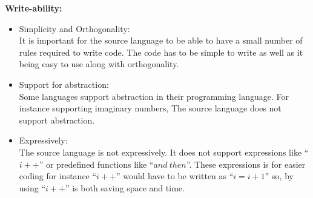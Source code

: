 \textbf{Write-ability:} \\
\begin{itemize}
\item Simplicity and Orthogonality: \\
It is important for the source language to be able to have a small number of rules required to write code. The code has to be simple to write as well as it being easy to use along with orthogonality.
\item Support for abstraction: \\
Some languages support abstraction  in their programming language. For instance supporting imaginary numbers, The source language does not support abstraction. 
\item Expressively: \\
The source language is not expressively. It does not support expressions like ``$i++$'' or predefined functions like ``$and~then$''. These expressions is for easier coding for instance ``$i++$'' would have to be written as ``$i = i + 1$'' so, by using ``$i++$'' is both saving space and time.
\end{itemize}


